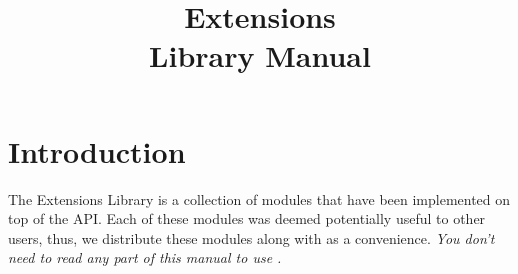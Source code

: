 \documentclass[10pt]{report}
\title{\converse{} Extensions\\Library Manual}
\begin{document}
\maketitle

\chapter{Introduction}

The \converse{} Extensions Library is a collection of modules that have
been implemented on top of the \converse{} API.  Each of these modules was
deemed potentially useful to other \converse{} users, thus, we distribute
these modules along with \converse{} as a convenience.  {\em You don't
need to read any part of this manual to use \converse{}.}










% 

\newpage

\end{document}
